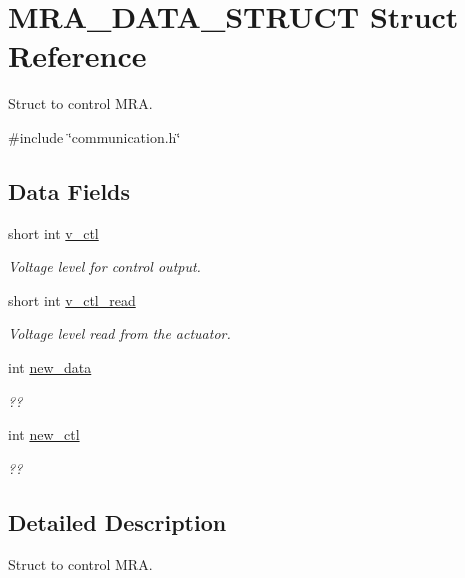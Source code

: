 \hypertarget{structMRA__DATA__STRUCT}{
\section{MRA\_\-DATA\_\-STRUCT Struct Reference}
\label{structMRA__DATA__STRUCT}
}


Struct to control MRA.  




{\ttfamily \#include \char`\"{}communication.h\char`\"{}}

\subsection*{Data Fields}
\begin{DoxyCompactItemize}
\item 
short int \hyperlink{structMRA__DATA__STRUCT_a64b4e6bb604e58de593a60c87942b966}{v\_\-ctl}
\begin{DoxyCompactList}\small\item\em Voltage level for control output. \item\end{DoxyCompactList}\item 
short int \hyperlink{structMRA__DATA__STRUCT_a3a31d57268c33b21ac915fdc27dfe474}{v\_\-ctl\_\-read}
\begin{DoxyCompactList}\small\item\em Voltage level read from the actuator. \item\end{DoxyCompactList}\item 
int \hyperlink{structMRA__DATA__STRUCT_afca6e851d302f3a786885a4e1eec79d7}{new\_\-data}
\begin{DoxyCompactList}\small\item\em ?? \item\end{DoxyCompactList}\item 
int \hyperlink{structMRA__DATA__STRUCT_a5b1af89ee717f5b14c18e8ac12e93e75}{new\_\-ctl}
\begin{DoxyCompactList}\small\item\em ?? \item\end{DoxyCompactList}\end{DoxyCompactItemize}


\subsection{Detailed Description}
Struct to control MRA. 

